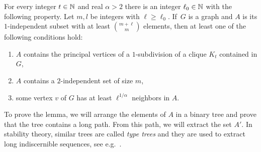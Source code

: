 \begin{lemma}\label{lem:apex}
For every integer $t\in \mathbb{N}$ and real $\alpha>2$ 
there is an integer $\ell_0\in\mathbb{N}$ with the following property.
Let $m,l$ be integers with $\ell\ge \ell_0$. 
If~$G$ is a graph and $A$ is its $1$-independent subset
with at least ${{m+\ell}\choose m}$ elements,
then at least one of the following conditions hold:
\begin{enumerate}
  \item $A$ contains the principal vertices of a $1$-subdivision of a clique $K_t$ contained in $G$, 
\item  $A$ contains a $2$-independent set of size $m$, 
\item  some vertex $v$ of $G$
has at least $\ell^{1/\alpha}$ neighbors in $A$.
\end{enumerate}
\end{lemma}


To prove the lemma, we will arrange the elements of $A$ in a binary tree
and prove that the tree contains a long path. From this path, we will 
extract the set $A'$. In stability theory, similar trees are called \emph{type trees} and they are used to extract long indiscernible sequences, see e.g.~\cite{malliaris2014regularity}. 

